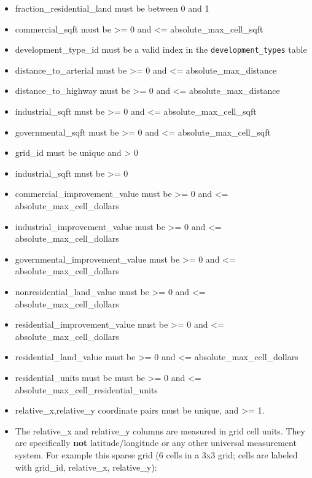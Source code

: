 \begin{itemize} \tight
\item fraction_residential_land must be between 0 and 1
\item commercial_sqft must be \textgreater{}= 0 and \textless{}=
absolute_max_cell_sqft
\item development_type_id must be a valid index in the \verb|development_types|
table
\item distance_to_arterial must be \textgreater{}= 0 and \textless{}=
absolute_max_distance
\item distance_to_highway must be \textgreater{}= 0 and \textless{}=
absolute_max_distance
\item industrial_sqft must be \textgreater{}= 0 and \textless{}=
absolute_max_cell_sqft
\item governmental_sqft must be \textgreater{}= 0 and \textless{}=
absolute_max_cell_sqft
\item grid_id must be unique and \textgreater{} 0
\item industrial_sqft must be \textgreater{}= 0
\item commercial_improvement_value must be \textgreater{}= 0 and \textless{}=
absolute_max_cell_dollars
\item industrial_improvement_value must be \textgreater{}= 0 and \textless{}=
absolute_max_cell_dollars
\item governmental_improvement_value must be \textgreater{}= 0 and \textless{}=
absolute_max_cell_dollars
\item nonresidential_land_value must be \textgreater{}= 0 and \textless{}=
absolute_max_cell_dollars
\item residential_improvement_value must be \textgreater{}= 0 and \textless{}=
absolute_max_cell_dollars
\item residential_land_value must be \textgreater{}= 0 and \textless{}=
absolute_max_cell_dollars
\item residential_units must be must be \textgreater{}= 0 and \textless{}=
absolute_max_cell_residential_units
\item relative_x,relative_y coordinate pairs must be unique, and
\textgreater{}= 1.
\item The relative_x and relative_y columns are measured in grid cell units.
They are specifically \textbf{not} latitude/longitude or any other universal
measurement system. For example this sparse grid (6 cells in a 3x3 grid; cells
are labeled with grid_id, relative_x, relative_y):


\end{itemize}
